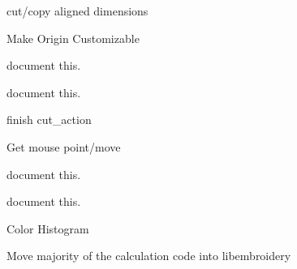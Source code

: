 \begin{DoxyRefList}
\label{todo__todo000058}%
%
cut/copy aligned dimensions 
\item[Member \mbox{\hyperlink{imgui__main_8c_a3603b6c716a31ea671a69789cf9914aa}{create\+Origin}} (void)]\label{todo__todo000043}%
%
Make Origin Customizable  
\item[Member \mbox{\hyperlink{imgui__main_8c_ae2a41608e07fec7445c05191fcd1595b}{crosshair\+\_\+color\+\_\+action}} (void)]\label{todo__todo000127}%
%
document this.  
\item[Member \mbox{\hyperlink{imgui__main_8c_a85580eb9dfffa5def742e63d016d969f}{cut}} (void)]\label{todo__todo000054}%
%
document this.  
\item[Member \mbox{\hyperlink{imgui__main_8c_a4c39def5f357299eb31be5a7644b1bb9}{cut\+\_\+action}} (void)]\label{todo__todo000108}%
%
finish cut\+\_\+action  
\item[Member \mbox{\hyperlink{imgui__main_8c_adeff67b5e32166b00dcde093be4ee92f}{cut\+\_\+selected}} (void)]\label{todo__todo000156}%
%
Get mouse point/move  
\item[Member \mbox{\hyperlink{imgui__main_8c_a59fa71de999ac511396682091d002c5a}{delete\+\_\+pressed}} (void)]\label{todo__todo000051}%
%
document this.  
\item[Member \mbox{\hyperlink{imgui__main_8c_aac781a443f5d71c4e23eaa744fcb5cc0}{delete\+\_\+selected}} (void)]\label{todo__todo000053}%
%
document this.  
\item[Member \mbox{\hyperlink{imgui__main_8c_aa8004b73ec5090fec48156195498de15}{details\+\_\+dialog}} (void)]\label{todo__todo000028}%
%
Color Histogram

\label{todo__todo000027}%
%
Move majority of the calculation code into libembroidery


\end{DoxyRefList}
